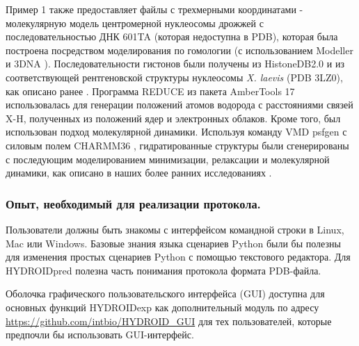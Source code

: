     Пример 1 также предоставляет файлы с трехмерными координатами - молекулярную модель центромерной нуклеосомы дрожжей с последовательностью ДНК 601TA \cite{cloutier_dna_2005} (которая недоступна в PDB), которая была построена посредством моделирования по гомологии (с использованием Modeller \cite{sali_comparative_1993} и 3DNA \cite{lu_3dna_2008}). Последовательности гистонов были получены из HistoneDB2.0 \cite{draizen_histonedb_2016} и из соответствующей рентгеновской структуры нуклеосомы \textit{X. laevis} (PDB 3LZ0), как описано ранее \cite{shaytan_hydroxyl-radical_2017}. Программа REDUCE \cite{word_asparagine_1999} из пакета AmberTools 17 \cite{case_amber_nodate} использовалась для генерации положений атомов водорода с расстояниями связей X-H, полученных из положений ядер и электронных облаков. Кроме того, был использован подход молекулярной динамики. Используя команду VMD psfgen с силовым полем CHARMM36 \cite{best_optimization_2012}, гидратированные структуры были сгенерированы с последующим моделированием минимизации, релаксации и молекулярной динамики, как описано в наших более ранних исследованиях \cite{shaytan_hydroxyl-radical_2017}.
    
    \subsubsection{Опыт, необходимый для реализации протокола.} Пользователи должны быть знакомы с интерфейсом командной строки в Linux, Mac или Windows. Базовые знания языка сценариев Python были бы полезны для изменения простых сценариев Python с помощью текстового редактора. Для HYDROIDpred полезна часть понимания протокола формата PDB-файла.

    Оболочка графического пользовательского интерфейса (GUI) доступна для основных функций HYDROIDexp как дополнительный модуль по адресу \url{https://github.com/intbio/HYDROID_GUI} для тех пользователей, которые предпочли бы использовать GUI-интерфейс.
    
    
    
